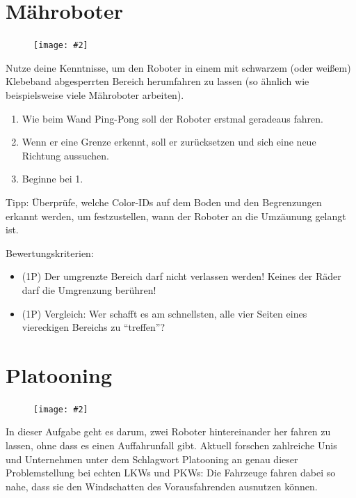 \documentclass[
	12pt,
	article,
	type=bsc, %
	colorbacktitle,
	instlogo,
	accentcolor=tud1c,
	german,
	twoside
]{tudexercise}
\newcommand{\easygcenter}[2]{
	\begin{figure}[h]
	\centering 
	\texttt{[image: \#2]}
	\end{figure}
}
\begin{document}
\newpage
\section{Mähroboter}
\easygcenter{.8\textwidth}{img/maehroboter.png}
Nutze deine Kenntnisse, um den Roboter in einem mit schwarzem (oder weißem) Klebeband abgesperrten Bereich herumfahren zu lassen (so ähnlich wie beispielsweise viele Mähroboter arbeiten).
\begin{enumerate}
\item Wie beim Wand Ping-Pong soll der Roboter erstmal geradeaus fahren.
\item Wenn er eine Grenze erkennt, soll er zurücksetzen und sich eine neue Richtung aussuchen.
\item Beginne bei 1.
\end{enumerate}

Tipp: Überprüfe, welche Color-IDs auf dem Boden und den Begrenzungen erkannt werden, um festzustellen, wann der Roboter an die Umzäunung gelangt ist.

Bewertungskriterien:
\begin{itemize}
\item (1P) Der umgrenzte Bereich darf nicht verlassen werden! Keines der Räder darf die Umgrenzung berühren!
\item (1P) Vergleich: Wer schafft es am schnellsten, alle vier Seiten eines viereckigen Bereichs zu “treffen”?
\end{itemize}

\newpage
\section{Platooning}
\easygcenter{.8\textwidth}{img/platooning.png}
In dieser Aufgabe geht es darum, zwei Roboter hintereinander her fahren zu lassen, ohne dass es einen Auffahrunfall gibt. Aktuell forschen zahlreiche Unis und Unternehmen unter dem Schlagwort Platooning an genau dieser Problemstellung bei echten LKWs und PKWs: Die Fahrzeuge fahren dabei so nahe, dass sie den Windschatten des Vorausfahrenden ausnutzen können.
\end{document}
